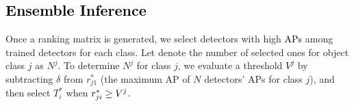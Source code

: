 \documentclass[10pt,twocolumn,letterpaper]{article}
\newcommand{\RE}{\textcolor{black}}
\newcommand{\RV}{\textcolor{black}}
\begin{document}



%

   
%
%
%
%
%
%

\subsection{\RV{Ensemble Inference}}
Once a ranking matrix is generated, we select detectors with high \RV{APs} among trained detectors for each class. Let denote the number of selected ones for object class $j$ as $N^{j}$. To determine $N^{j}$ for class $j$, we evaluate a threshold \RE{$V^{j}$} by subtracting $\delta$ from $r^{*}_{j1}$ (\ie the maximum AP of $N$ detectors' APs for class $j$), and then select $T^{*}_{i}$ when $\RV{r^{*}_{ji}} \geq {V^{j}}$. 
\end{document}
